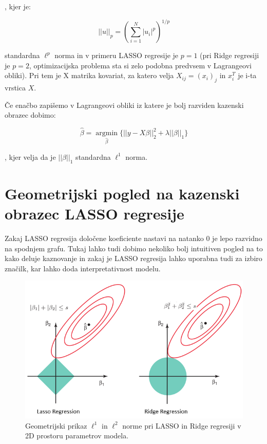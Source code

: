 \documentclass[onecolumn]{report}
\begin{document}
, kjer je:

\begin{equation}
	||u||_p = (\sum_{i = 1}^{N}|u_i|^p)^{1/p}
	 \label{eqn3} 
\end{equation}

standardna $\ell^p$ norma in v primeru LASSO regresije je $p=1$ (pri Ridge regresiji je $p=2$, optimizacijska problema sta si zelo podobna predvsem v Lagrangeovi obliki). Pri tem je X matrika kovariat, za katero velja $X_{ij} = (x_i)_j$ in $x_i^T$ je i-ta vrstica $X$.

\newpage

Če enačbo zapišemo v Lagrangeovi obliki iz katere je bolj razviden kazenski obrazec dobimo:

\begin{equation}
	\hat{\beta} =  \underset{\hat{\beta}}{\operatorname{argmin}} \{ ||y - X\beta||_2^2 + \lambda ||\beta||_1 \}
	\label{eqn4} 
\end{equation}

, kjer velja da je $||\beta||_1$ standardna $\ell^1$ norma.

\section*{Geometrijski pogled na kazenski obrazec LASSO regresije}

Zakaj LASSO regresija določene koeficiente nastavi na natanko 0 je lepo razvidno na spodnjem grafu. Tukaj lahko tudi dobimo nekoliko bolj intuitiven pogled na to kako deluje kaznovanje in zakaj je LASSO regresija lahko uporabna tudi za izbiro značilk, kar lahko doda interpretativnost modelu.

\begin{figure}[!htb]
	\centering
	\includegraphics[width=1\linewidth]{fig/geo.png}
	\caption{Geometrijski prikaz $\ell^1$ in $\ell^2$ norme pri LASSO in Ridge regresiji v 2D prostoru parametrov modela.}
	\label{fig:vqvae}
\end{figure}
\end{document}
